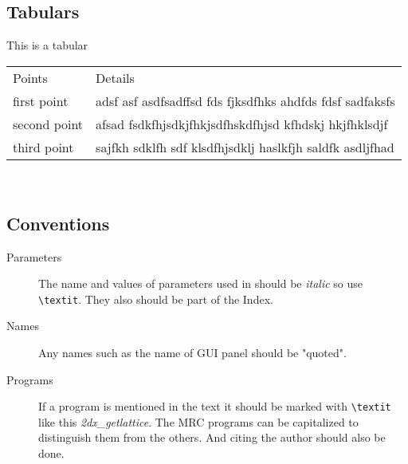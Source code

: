 \subsection{Tabulars}
This is a tabular

\vspace{1em}
\begin{tabular}{l l}
		\toprule
		Points & Details \\
		\cmidrule{1-2}
			first point & adsf asf asdfsadffsd fds fjksdfhks ahdfds fdsf sadfaksfs \\
			second point & afsad fsdkfhjsdkjfhkjsdfhskdfhjsd kfhdskj hkjfhklsdjf \\
			third point & sajfkh sdklfh sdf klsdfhjsdklj haslkfjh saldfk asdljfhad \\
		\bottomrule
\end{tabular}\\

\subsection{Conventions}

\begin{description}
\item[Parameters] The name and values of parameters used in {\twodx} should be \textit{italic} so use \texttt{\textbackslash textit}. They also should be part of the Index.
\item[Names] Any names such as the name of GUI panel should be "quoted".
\item[Programs] If a program is mentioned in the text it should be marked with  \texttt{\textbackslash textit} like this \textit{2dx\_getlattice}. The MRC programs can be capitalized to distinguish them from the others. And citing the author should also be done.
\end{description}


